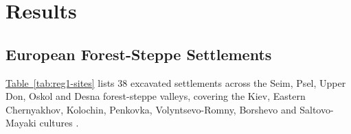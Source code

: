 \IfFileExists{../../_shared/template/intellte.cls}{\documentclass[10pt,onecolumn]{../../_shared/template/intellte}}{\documentclass[10pt,onecolumn]{intellte}}
\providecommand{\crdxref}[2]{\hyperref[#2]{#1~\ref*{#2}}}
\begin{document}
\section{Results}\label{results}

\subsection{European Forest-Steppe
Settlements}\label{european-forest-steppe-settlements}

\crdxref{Table}{tab:reg1-sites} lists 38 excavated settlements across
the Seim, Psel, Upper Don, Oskol and Desna forest-steppe valleys,
covering the Kiev, Eastern Chernyakhov, Kolochin, Penkovka,
Volyntsevo-Romny, Borshevo and Saltovo-Mayaki cultures
.
\end{document}
